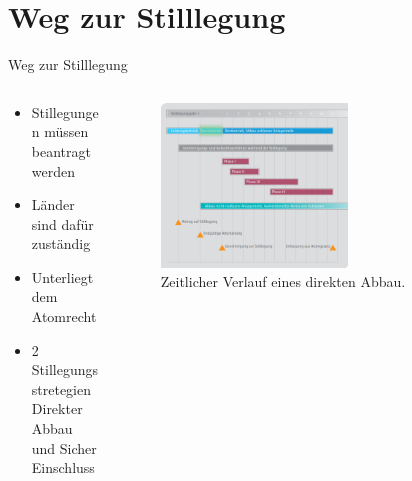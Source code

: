 \section{Weg zur Stilllegung}



\begin{frame}{ Weg zur Stilllegung }
   \begin{columns}

    \begin{column}{0.48\textwidth}
      \begin{itemize}
       \setlength\itemsep{1.2em}
         \item{ Stillegungen müssen beantragt werden}
         \item{ Länder sind dafür zuständig}
         \item{ Unterliegt dem Atomrecht}
         \item{ 2 Stillegungsstretegien \\ Direkter Abbau und Sicher Einschluss}
      \end{itemize}
    \end{column}

    \begin{column}{0.48\textwidth}
      \begin{figure}
        \centering
        \includegraphics[width=0.6\textwidth]{./bilder/stilllegung_nachbetrieb.pdf}
        \caption{ Zeitlicher Verlauf eines direkten Abbau\cite{stilllegung_grs}. }
        \label{ fig: stillegung }
      \end{figure}
    \end{column}

  \end{columns}
\end{frame}




